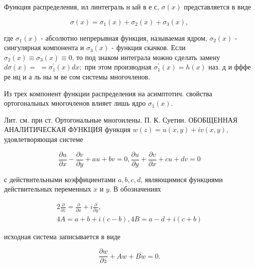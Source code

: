 \documentclass[10pt]{article}
\begin{document}
Функция распределения, ил линтеграль н ый в е с, $\sigma(x)$ представляется в виде



\[

\sigma(x)=\sigma_{1}(x)+\sigma_{2}(x)+\sigma_{3}(x),

\]



где $\sigma_{1}(x)$ - абсолютно непрерывная функция, называемая ядром, $\sigma_{2}(x)$ - сингулярная компонента и $\sigma_{3}(x)$ - функция скачков. Если $\sigma_{2}(x) \equiv \sigma_{3}(x) \equiv 0$, то под знаком интеграла можно сделать замену $d \sigma(x)=$ $=\sigma_{1}^{\prime}(x) d x ;$ при этом производная $\sigma_{1}^{\prime}(x)=h(x)$ наз. д и фффе ре нц и а ль ны м ве сом системы многочленов.



Из трех компонент функции распределения на асимптотич. свойства ортогональных многочленов влияет лишь ядро $\sigma_{1}(x)$.



Лит. см. при ст. Ортогональные многоилены. П. К. Суетин. ОБОБЩЕННАЯ АНАЛИТИЧЕСКАЯ ФУНКЦИЯ функция $w(z)=u(x, y)+i v(x, y), \quad$ удовлетворяющая системе



\[

\frac{\partial u}{\partial x}-\frac{\partial v}{\partial y}+a u+b v=0, \frac{\partial u}{\partial y}+\frac{\partial v}{\partial x}+c u+d v=0

\]



с действительными коэффициентами $a, b, c, d$, являющимися функциями действительных переменных $x$ и $y$. В обозначениях



\[

\begin{gathered}

2 \frac{\partial}{\partial \bar{z}}=\frac{\partial}{\partial x}+i \frac{\partial}{\partial y}, \\

4 A=a+b+i(c-b), 4 B=a-d+i(c+b)

\end{gathered}

\]



исходная система записывается в виде



\[

\frac{\partial w}{\partial \bar{z}}+A w+\overline{B w}=0 .

\]
\end{document}
